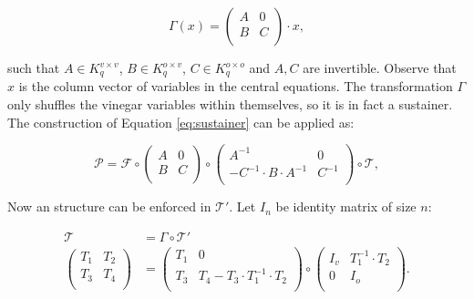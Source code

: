 \documentclass{ufsctex/ufsctex}
\begin{document}
\begin{equation}
\Gamma(x) =
\begin{pmatrix}
A & 0 \\
B & C \\
\end{pmatrix} \cdot x,
\end{equation}

\noindent
such that $A \in K^{v \times v}_q$, $B \in K^{o \times v}_q$, $C \in K^{o
\times o}_q$ and $A, C$ are invertible. Observe that $x$ is the column vector
of variables in the central equations. The transformation $\Gamma$ only
shuffles the vinegar variables within themselves, so it is in fact a sustainer.
The construction of Equation \ref{eq:sustainer} can be applied as:

\begin{equation}
\mathcal{P} = \mathcal{F} \circ
\begin{pmatrix}
A & 0 \\
B & C \\
\end{pmatrix}
\circ
\begin{pmatrix}
A^{-1} & 0 \\
-C^{-1} \cdot B \cdot A^{-1} & C^{-1} \\
\end{pmatrix}
\circ \mathcal{T},
\end{equation}

Now an structure can be enforced in $\mathcal{T'}$. Let $I_n$ be identity
matrix of size $n$:

\begin{equation}
\begin{split}
\mathcal{T} &= \Gamma \circ \mathcal{T'} \\
\begin{pmatrix}
T_1 & T_2 \\
T_3 & T_4 \\
\end{pmatrix}
&=
\begin{pmatrix}
T_1 & 0 \\
T_3 & T_4 - T_3 \cdot T_1^{-1} \cdot T_2 \\
\end{pmatrix}
\circ
\begin{pmatrix}
I_v & T_1^{-1} \cdot T_2 \\
0 & I_o \\
\end{pmatrix}. \\
\end{split}
\end{equation}
\end{document}
